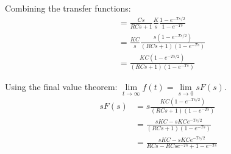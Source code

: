 \documentclass[11pt]{article}
\begin{document}
Combining the transfer functions:
\begin{subequations}
  \begin{align}
    &= \frac{Cs}{RCs + 1} \frac{K}{s} \frac{1-e^{-Ts/2}}{1-e^{-Ts}} \\
    &= \frac{KC}{s} \frac{s(1-e^{-Ts/2})}{(RCs + 1)(1-e^{-Ts})} \\
    &= \frac{KC(1-e^{-Ts/2})}{(RCs + 1)(1-e^{-Ts})}
  \end{align}
\end{subequations}

Using the final value theorem: $\lim\limits_{t\to \infty} f(t) = \lim\limits_{s\to 0} sF(s)$.
\begin{subequations}
  \begin{align}
    sF(s) &= s\frac{KC(1-e^{-Ts/2})}{(RCs + 1)(1-e^{-Ts})} \\
    &= \frac{sKC - sKCe^{-Ts/2}}{(RCs + 1)(1-e^{-Ts})} \\
    &= \frac{sKC - sKCe^{-Ts/2}}{RCs - RCse^{-Ts} + 1 - e^{-Ts}}
  \end{align}
\end{subequations}

\end{document}
